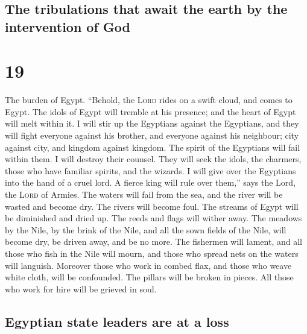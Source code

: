 \hypertarget{the-tribulations-that-await-the-earth-by-the-intervention-of-god}{%
\subsection{The tribulations that await the earth by the intervention of
God}\label{the-tribulations-that-await-the-earth-by-the-intervention-of-god}}

\hypertarget{section-18}{%
\section{19}\label{section-18}}

 The burden of Egypt. ``Behold, the \textsc{Lord} rides on
a swift cloud, and comes to Egypt. The idols of Egypt will tremble at
his presence; and the heart of Egypt will melt within it. 
I will stir up the Egyptians against the Egyptians, and they will fight
everyone against his brother, and everyone against his neighbour; city
against city, and kingdom against kingdom.  The spirit of
the Egyptians will fail within them. I will destroy their counsel. They
will seek the idols, the charmers, those who have familiar spirits, and
the wizards.  I will give over the Egyptians into the hand
of a cruel lord. A fierce king will rule over them,'' says the Lord, the
\textsc{Lord} of Armies.  The waters will fail from the
sea, and the river will be wasted and become dry.  The
rivers will become foul. The streams of Egypt will be diminished and
dried up. The reeds and flags will wither away.  The
meadows by the Nile, by the brink of the Nile, and all the sown fields
of the Nile, will become dry, be driven away, and be no more.
 The fishermen will lament, and all those who fish in the
Nile will mourn, and those who spread nets on the waters will languish.
 Moreover those who work in combed flax, and those who
weave white cloth, will be confounded.  The pillars will
be broken in pieces. All those who work for hire will be grieved in
soul.

\hypertarget{egyptian-state-leaders-are-at-a-loss}{%
\subsection{Egyptian state leaders are at a
loss}\label{egyptian-state-leaders-are-at-a-loss}}

